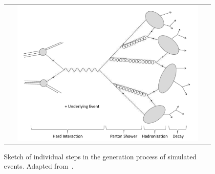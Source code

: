 \begin{figure}[!tp]
  \centering
  \begin{tabular}{c}
    \includegraphics[width=0.9\textwidth]{figures/MCGeneration.pdf} 
  \end{tabular}
  \caption{Sketch of individual steps in the generation process of simulated events. Adapted from~\cite{bib:hepmc}.}
  \label{fig:mc_gen}
\end{figure}
